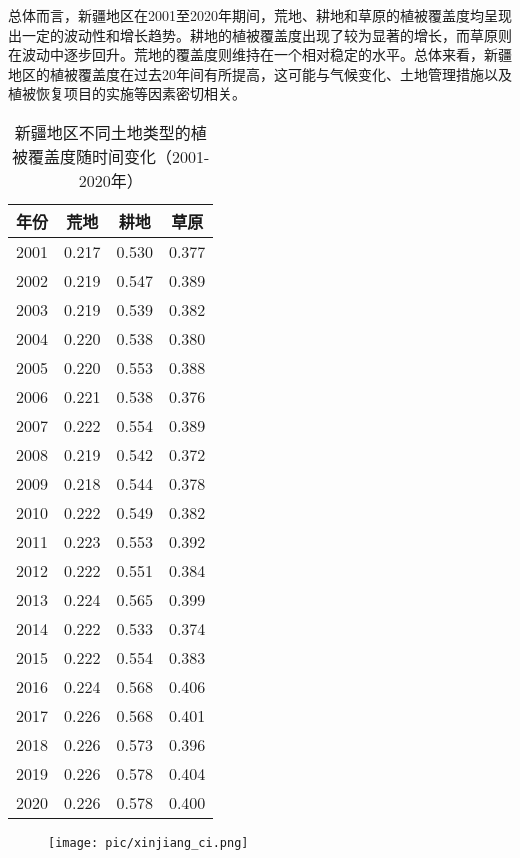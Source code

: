 \documentclass{article}
\begin{document}
		总体而言，新疆地区在2001至2020年期间，荒地、耕地和草原的植被覆盖度均呈现出一定的波动性和增长趋势。耕地的植被覆盖度出现了较为显著的增长，而草原则在波动中逐步回升。荒地的覆盖度则维持在一个相对稳定的水平。总体来看，新疆地区的植被覆盖度在过去20年间有所提高，这可能与气候变化、土地管理措施以及植被恢复项目的实施等因素密切相关。
		\begin{table}[H]
			\centering
			\begin{tabular}{|c|c|c|c|}
				\hline
				\textbf{年份} & \textbf{荒地} & \textbf{耕地} & \textbf{草原} \\
				\hline
				2001 & 0.217 & 0.530 & 0.377 \\
				2002 & 0.219 & 0.547 & 0.389 \\
				2003 & 0.219 & 0.539 & 0.382 \\
				2004 & 0.220 & 0.538 & 0.380 \\
				2005 & 0.220 & 0.553 & 0.388 \\
				2006 & 0.221 & 0.538 & 0.376 \\
				2007 & 0.222 & 0.554 & 0.389 \\
				2008 & 0.219 & 0.542 & 0.372 \\
				2009 & 0.218 & 0.544 & 0.378 \\
				2010 & 0.222 & 0.549 & 0.382 \\
				2011 & 0.223 & 0.553 & 0.392 \\
				2012 & 0.222 & 0.551 & 0.384 \\
				2013 & 0.224 & 0.565 & 0.399 \\
				2014 & 0.222 & 0.533 & 0.374 \\
				2015 & 0.222 & 0.554 & 0.383 \\
				2016 & 0.224 & 0.568 & 0.406 \\
				2017 & 0.226 & 0.568 & 0.401 \\
				2018 & 0.226 & 0.573 & 0.396 \\
				2019 & 0.226 & 0.578 & 0.404 \\
				2020 & 0.226 & 0.578 & 0.400 \\
				\hline
			\end{tabular}
			\caption{新疆地区不同土地类型的植被覆盖度随时间变化（2001-2020年）}
		\end{table}

		
		
		\begin{figure}[H]  %
			\centering
			\texttt{[image: pic/xinjiang\_ci.png]} %
		\end{figure}
		
\end{document}
